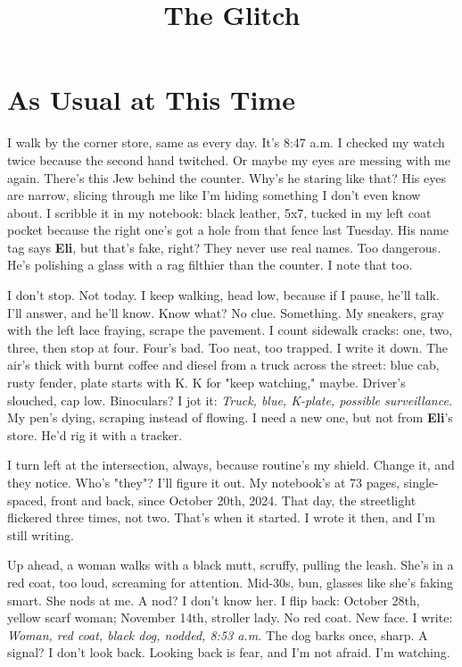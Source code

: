\documentclass{article}
\title{The Glitch}
\author{}
\date{}
\begin{document}
\maketitle

\section{As Usual at This Time}

I walk by the corner store, same as every day. It's 8:47 a.m.  I checked my watch twice because the second hand twitched. Or maybe my eyes are messing with me again.  There's this Jew behind the counter.  Why's he staring like that? His eyes are narrow, slicing through me like I'm hiding something I don't even know about.  I scribble it in my notebook: black leather, 5x7, tucked in my left coat pocket because the right one's got a hole from that fence last Tuesday.  His name tag says \textbf{Eli}, but that's fake, right? They never use real names.  Too dangerous. He's polishing a glass with a rag filthier than the counter. I note that too.

I don't stop.  Not today. I keep walking, head low, because if I pause, he'll talk. I'll answer, and he'll know.  Know what?  No clue. Something. My sneakers, gray with the left lace fraying, scrape the pavement. I count sidewalk cracks: one, two, three, then stop at four. Four's bad.  Too neat, too trapped.  I write it down. The air's thick with burnt coffee and diesel from a truck across the street: blue cab, rusty fender, plate starts with K.  K for "keep watching," maybe.  Driver's slouched, cap low.  Binoculars?  I jot it: \textit{Truck, blue, K-plate, possible surveillance.} My pen's dying, scraping instead of flowing. I need a new one, but not from \textbf{Eli}'s store. He'd rig it with a tracker.

I turn left at the intersection, always, because routine's my shield. Change it, and they notice.  Who's "they"?  I'll figure it out. My notebook's at 73 pages, single-spaced, front and back, since October 20th, 2024.  That day, the streetlight flickered three times, not two.  That's when it started. I wrote it then, and I'm still writing.

Up ahead, a woman walks with a black mutt, scruffy, pulling the leash. She's in a red coat, too loud, screaming for attention. Mid-30s, bun, glasses like she's faking smart. She nods at me.  A nod? I don't know her. I flip back: October 28th, yellow scarf woman; November 14th, stroller lady. No red coat. New face. I write: \textit{Woman, red coat, black dog, nodded, 8:53 a.m.} The dog barks once, sharp. A signal?  I don't look back. Looking back is fear, and I'm not afraid. I'm watching.
\end{document}
